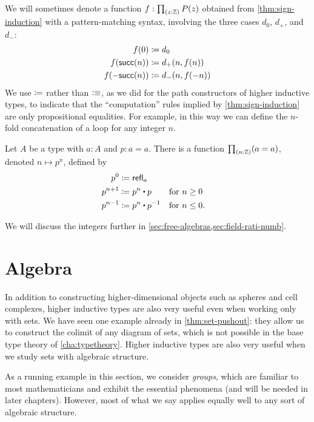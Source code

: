 We will sometimes denote a function $f:\prd{z:\Z} P(z)$ obtained from \cref{thm:sign-induction} with a pattern-matching syntax, involving the three cases $d_0$, $d_+$, and $d_-$:
\begin{align*}
  f(0) &\coloneqq d_0\\
  f(\mathsf{succ}(n)) &\coloneqq d_+(n,f(n))\\
  f(-\mathsf{succ}(n)) &\coloneqq d_-(n,f(-n))
\end{align*}
We use $\coloneqq$ rather than $\vcentcolon\equiv$, as we did for the path constructors of higher inductive types, to indicate that the ``computation'' rules implied by \cref{thm:sign-induction} are only propositional equalities.
For example, in this way we can define the $n$-fold concatenation of a loop for any integer $n$.

\begin{cor}\label{thm:looptothe}
  Let $A$ be a type with $a:A$ and $p:a=a$.
  There is a function $\prd{n:\Z} (a=a)$, denoted $n\mapsto p^n$, defined by
  \begin{align*}
    p^0 &\defid \refl{a}\\
    p^{n+1} &\defid p^n \ct p
    & &\text{for $n\ge 0$}\\
    p^{n-1} &\defid p^n \ct \opp p
    & &\text{for $n\le 0$.}
  \end{align*}
\end{cor}

We will discuss the integers further in \cref{sec:free-algebras,sec:field-rati-numb}.

%

\section{Algebra}
\label{sec:free-algebras}

In addition to constructing higher-dimensional objects such as spheres and cell complexes, higher inductive types are also very useful even when working only with sets.
We have seen one example already in \cref{thm:set-pushout}: they allow us to construct the colimit of any diagram of sets, which is not possible in the base type theory of \cref{cha:typetheory}.
Higher inductive types are also very useful when we study sets with algebraic structure.

As a running example in this section, we consider \emph{groups}, which are familiar to most mathematicians and exhibit the essential phenomena (and will be needed in later chapters).
However, most of what we say applies equally well to any sort of algebraic structure.

